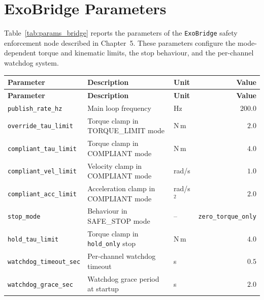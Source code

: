 \section{ExoBridge Parameters}
\label{app:params:bridge}

Table~\ref{tab:params_bridge} reports the parameters of the \texttt{ExoBridge} safety enforcement node described in Chapter~5. These parameters configure the mode-dependent torque and kinematic limits, the stop behaviour, and the per-channel watchdog system.

\small
\begin{tabularx}{\textwidth}{@{}l L l r@{}}
\caption{ExoBridge enforcement gateway parameters
(\texttt{exo\_bridge\_params.yaml}).}
\label{tab:params_bridge}\\
\hline
\textbf{Parameter} & \textbf{Description} & \textbf{Unit} & \textbf{Value} \\
\hline
\endfirsthead
\hline
\textbf{Parameter} & \textbf{Description} & \textbf{Unit} & \textbf{Value} \\
\hline
\endhead
\texttt{publish\_rate\_hz}    & Main loop frequency                       & Hz       & $200.0$ \\
\texttt{override\_tau\_limit} & Torque clamp in TORQUE\_LIMIT mode        & N\,m     & $2.0$   \\
\texttt{compliant\_tau\_limit}& Torque clamp in COMPLIANT mode            & N\,m     & $4.0$   \\
\texttt{compliant\_vel\_limit}& Velocity clamp in COMPLIANT mode          & rad/s    & $1.0$   \\
\texttt{compliant\_acc\_limit}& Acceleration clamp in COMPLIANT mode      & rad/s$^2$& $2.0$   \\
\texttt{stop\_mode}           & Behaviour in SAFE\_STOP mode              & --       & \texttt{zero\_torque\_only} \\
\texttt{hold\_tau\_limit}     & Torque clamp in \texttt{hold\_only} stop  & N\,m     & $4.0$   \\
\texttt{watchdog\_timeout\_sec}& Per-channel watchdog timeout             & s        & $0.5$   \\
\texttt{watchdog\_grace\_sec} & Watchdog grace period at startup          & s        & $2.0$   \\
\hline
\end{tabularx}
\normalsize

